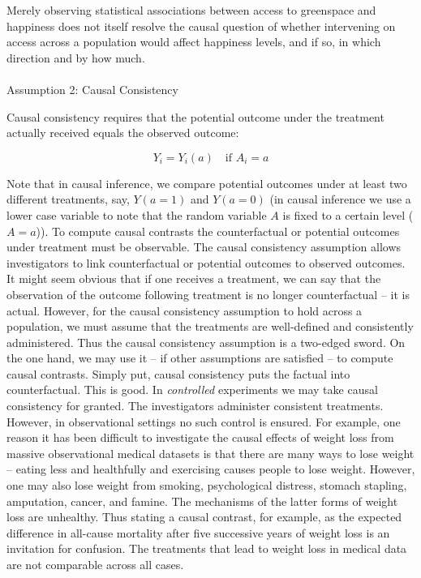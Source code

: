 \documentclass[
  singlecolumn]{article}
\makeatletter
\let\oldparagraph\paragraph
\renewcommand{\paragraph}{
    \@ifstar
      \xxxParagraphStar
      \xxxParagraphNoStar
  }
\newcommand{\xxxParagraphStar}[1]{\oldparagraph*{#1}\mbox{}}
\newcommand{\xxxParagraphNoStar}[1]{\oldparagraph{#1}\mbox{}}
\makeatother
\begin{document}
Merely observing statistical associations between access to greenspace
and happiness does not itself resolve the causal question of whether
intervening on access across a population would affect happiness levels,
and if so, in which direction and by how much.

\paragraph{Assumption 2: Causal
Consistency}\label{assumption-2-causal-consistency}

Causal consistency requires that the potential outcome under the
treatment actually received equals the observed outcome:

\[
Y_i = Y_i(a) \quad \text{if } A_i = a
\]

Note that in causal inference, we compare potential outcomes under at
least two different treatments, say, \(Y(a = 1)\) and \(Y(a = 0)\) (in
causal inference we use a lower case variable to note that the random
variable \(A\) is fixed to a certain level (\(A = a\))). To compute
causal contrasts the counterfactual or potential outcomes under
treatment must be observable. The causal consistency assumption allows
investigators to link counterfactual or potential outcomes to observed
outcomes. It might seem obvious that if one receives a treatment, we can
say that the observation of the outcome following treatment is no longer
counterfactual -- it is actual. However, for the causal consistency
assumption to hold across a population, we must assume that the
treatments are well-defined and consistently administered. Thus the
causal consistency assumption is a two-edged sword. On the one hand, we
may use it -- if other assumptions are satisfied -- to compute causal
contrasts. Simply put, causal consistency puts the factual into
counterfactual. This is good. In \emph{controlled} experiments we may
take causal consistency for granted. The investigators administer
consistent treatments. However, in observational settings no such
control is ensured. For example, one reason it has been difficult to
investigate the causal effects of weight loss from massive observational
medical datasets is that there are many ways to lose weight -- eating
less and healthfully and exercising causes people to lose weight.
However, one may also lose weight from smoking, psychological distress,
stomach stapling, amputation, cancer, and famine. The mechanisms of the
latter forms of weight loss are unhealthy. Thus stating a causal
contrast, for example, as the expected difference in all-cause mortality
after five successive years of weight loss is an invitation for
confusion. The treatments that lead to weight loss in medical data are
not comparable across all cases.
\end{document}
